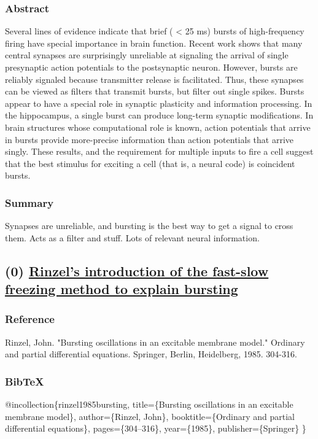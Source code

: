 \documentclass[11pt]{article}
\begin{document}
\subsubsection{Abstract}
\label{sec:org05756cf}
Several lines of evidence indicate that brief ( < 25 ms) bursts of
high-frequency firing have special importance in brain function.
Recent work shows that many central synapses are surprisingly
unreliable at signaling the arrival of single presynaptic action
potentials to the postsynaptic neuron. However, bursts are reliably
signaled because transmitter release is facilitated. Thus, these
synapses can be viewed as filters that transmit bursts, but filter out
single spikes. Bursts appear to have a special role in synaptic
plasticity and information processing. In the hippocampus, a single
burst can produce long-term synaptic modifications. In brain
structures whose computational role is known, action potentials that
arrive in bursts provide more-precise information than action
potentials that arrive singly. These results, and the requirement for
multiple inputs to fire a cell suggest that the best stimulus for
exciting a cell (that is, a neural code) is coincident bursts.

\subsubsection{Summary}
\label{sec:org191b9eb}
Synapses are unreliable, and bursting is the best way to get a signal to cross them.
Acts as a filter and stuff.
Lots of relevant neural information.

\subsection{(0) \href{https://link.springer.com/content/pdf/10.1007/BFb0074739.pdf}{Rinzel's introduction of the fast-slow freezing method to explain bursting}}
\label{sec:org39f18c7}
\subsubsection{Reference}
\label{sec:org9ea909d}
Rinzel, John. "Bursting oscillations in an excitable membrane model." Ordinary and partial differential equations. Springer, Berlin, Heidelberg, 1985. 304-316.

\subsubsection{BibTeX}
\label{sec:orgf55bee3}
@incollection\{rinzel1985bursting,
  title=\{Bursting oscillations in an excitable membrane model\},
  author=\{Rinzel, John\},
  booktitle=\{Ordinary and partial differential equations\},
  pages=\{304--316\},
  year=\{1985\},
  publisher=\{Springer\}
\}
\end{document}
